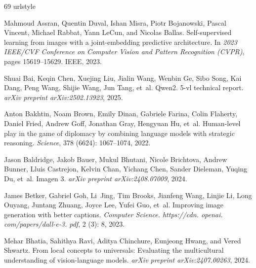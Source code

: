 \begin{thebibliography}{69}
\providecommand{\natexlab}[1]{#1}
\providecommand{\url}[1]{\texttt{#1}}
\expandafter\ifx\csname urlstyle\endcsname\relax
  \providecommand{\doi}[1]{doi: #1}\else
  \providecommand{\doi}{doi: \begingroup \urlstyle{rm}\Url}\fi

Mahmoud Assran, Quentin Duval, Ishan Misra, Piotr Bojanowski, Pascal Vincent, Michael Rabbat, Yann LeCun, and Nicolas Ballas.
\newblock Self-supervised learning from images with a joint-embedding predictive architecture.
\newblock In \emph{2023 IEEE/CVF Conference on Computer Vision and Pattern Recognition (CVPR)}, pages 15619--15629. IEEE, 2023.

Shuai Bai, Keqin Chen, Xuejing Liu, Jialin Wang, Wenbin Ge, Sibo Song, Kai Dang, Peng Wang, Shijie Wang, Jun Tang, et~al.
\newblock Qwen2. 5-vl technical report.
\newblock \emph{arXiv preprint arXiv:2502.13923}, 2025.

Anton Bakhtin, Noam Brown, Emily Dinan, Gabriele Farina, Colin Flaherty, Daniel Fried, Andrew Goff, Jonathan Gray, Hengyuan Hu, et~al.
\newblock Human-level play in the game of diplomacy by combining language models with strategic reasoning.
\newblock \emph{Science}, 378 (6624): 1067--1074, 2022.

Jason Baldridge, Jakob Bauer, Mukul Bhutani, Nicole Brichtova, Andrew Bunner, Lluis Castrejon, Kelvin Chan, Yichang Chen, Sander Dieleman, Yuqing Du, et~al.
\newblock Imagen 3.
\newblock \emph{arXiv preprint arXiv:2408.07009}, 2024.

James Betker, Gabriel Goh, Li~Jing, Tim Brooks, Jianfeng Wang, Linjie Li, Long Ouyang, Juntang Zhuang, Joyce Lee, Yufei Guo, et~al.
\newblock Improving image generation with better captions.
\newblock \emph{Computer Science. https://cdn. openai. com/papers/dall-e-3. pdf}, 2 (3): 8, 2023.

Mehar Bhatia, Sahithya Ravi, Aditya Chinchure, Eunjeong Hwang, and Vered Shwartz.
\newblock From local concepts to universals: Evaluating the multicultural understanding of vision-language models.
\newblock \emph{arXiv preprint arXiv:2407.00263}, 2024.


\end{thebibliography}

